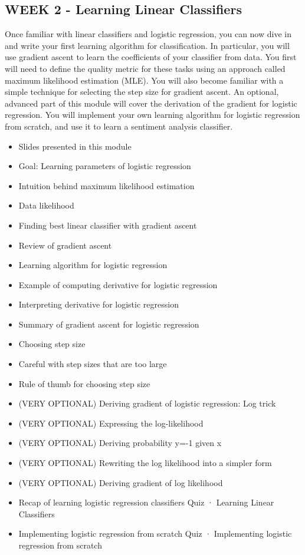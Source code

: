 \subsection{WEEK 2 - Learning Linear Classifiers}
Once familiar with linear classifiers and logistic regression, you can now dive in and write your first learning algorithm for classification. In particular, you will use gradient ascent to learn the coefficients of your classifier from data. You first will need to define the quality metric for these tasks using an approach called maximum likelihood estimation (MLE). You will also become familiar with a simple technique for selecting the step size for gradient ascent. An optional, advanced part of this module will cover the derivation of the gradient for logistic regression. You will implement your own learning algorithm for logistic regression from scratch, and use it to learn a sentiment analysis classifier.
\begin{itemize}
\item Slides presented in this module
\item Goal: Learning parameters of logistic regression
\item Intuition behind maximum likelihood estimation
\item Data likelihood
\item Finding best linear classifier with gradient ascent
\item Review of gradient ascent
\item Learning algorithm for logistic regression
\item Example of computing derivative for logistic regression
\item Interpreting derivative for logistic regression
\item Summary of gradient ascent for logistic regression
\item Choosing step size
\item Careful with step sizes that are too large
\item Rule of thumb for choosing step size
\item (VERY OPTIONAL) Deriving gradient of logistic regression: Log trick
\item (VERY OPTIONAL) Expressing the log-likelihood
\item (VERY OPTIONAL) Deriving probability y=-1 given x
\item (VERY OPTIONAL) Rewriting the log likelihood into a simpler form
\item (VERY OPTIONAL) Deriving gradient of log likelihood
\item Recap of learning logistic regression classifiers
Quiz · Learning Linear Classifiers
\item Implementing logistic regression from scratch
Quiz · Implementing logistic regression from scratch
\end{itemize}

